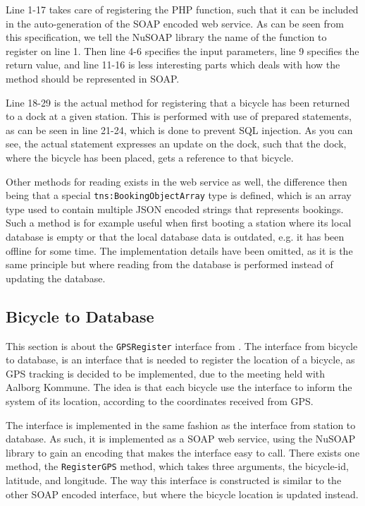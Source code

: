 Line 1-17 takes care of registering the PHP function, such that it can be included in the auto-generation of the SOAP encoded web service.
As can be seen from this specification, we tell the NuSOAP library the name of the function to register on line 1.
Then line 4-6 specifies the input parameters, line 9 specifies the return value, and line 11-16 is less interesting parts which deals with how the method should be represented in SOAP.

Line 18-29 is the actual method for registering that a bicycle has been returned to a dock at a given station.
This is performed with use of prepared statements, as can be seen in line 21-24, which is done to prevent SQL injection.
As you can see, the actual statement expresses an update on the dock, such that the dock, where the bicycle has been placed, gets a reference to that bicycle.

Other methods for reading exists in the web service as well, the difference then being that a special \texttt{tns:BookingObjectArray} type is defined, which is an array type used to contain multiple JSON encoded strings that represents bookings. Such a method is for example useful when first booting a station where its local database is empty or that the local database data is outdated, e.g. it has been offline for some time.
The implementation details have been omitted, as it is the same principle but where reading from the database is performed instead of updating the database.

\subsection{Bicycle to Database}\label{subsec:bicycletodatabase}
This section is about the \texttt{GPSRegister} interface from .
The interface from bicycle to database, is an interface that is needed to register the location of a bicycle, as GPS tracking is decided to be implemented, due to the meeting held with Aalborg Kommune.
The idea is that each bicycle use the interface to inform the system of its location, according to the coordinates received from GPS.

The interface is implemented in the same fashion as the interface from station to database.
As such, it is implemented as a SOAP web service, using the NuSOAP library to gain an encoding that makes the interface easy to call.
There exists one method, the \texttt{RegisterGPS} method, which takes three arguments, the bicycle-id, latitude, and longitude.
The way this interface is constructed is similar to the other SOAP encoded interface, but where the bicycle location is updated instead.